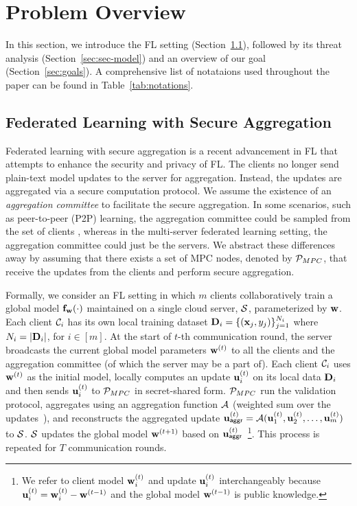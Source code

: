 
\section{Problem Overview}
\label{sec:prelim}

In this section, we introduce the FL setting (Section~\ref{sec:setup}), followed by its threat analysis (Section~\ref{sec:sec-model}) and an overview of our goal (Section~\ref{sec:goals}).
A comprehensive list of notataions used throughout the paper can be found in Table~\ref{tab:notations}.

\subsection{Federated Learning with Secure Aggregation}
\label{sec:setup}


Federated learning with secure aggregation is a recent advancement in FL that attempts to enhance the security and privacy of FL. The clients no longer send plain-text model updates to the server for aggregation. Instead, the updates are aggregated via a secure computation protocol. We assume the existence of an \emph{aggregation committee} to facilitate the secure aggregation. In some scenarios, such as peer-to-peer (P2P) learning, the aggregation committee could be sampled from the set of clients \cite{SP:MWAPR23,CCS:BBGLR20}, whereas in the multi-server federated learning setting, the aggregation committee could just be the servers. We abstract these differences away by assuming that there exists a set of MPC nodes, denoted by $\mathcal{P}_{MPC}$, that receive the updates from the clients and perform secure aggregation.



Formally, we consider an FL setting in which $m$ clients collaboratively train a global model $\mathbf{f}_{\mathbf{w}}(\cdot)$ maintained on a single cloud server, $\mathcal{S}$, parameterized by $\mathbf{w}$. Each client $\mathcal{C}_i$ has its own local training dataset $\mathbf{D}_i = \{(\mathbf{x}_j, y_j)\}_{j=1}^{N_i}$ where $N_i = |\mathbf{D}_i|$, for $i\in [m]$. 
At the start of $t$-th communication round, the server broadcasts the current global model parameters $\mathbf{w}^{(t)}$ to all the clients and the aggregation committee (of which the server may be a part of). Each client $\mathcal{C}_i$ uses $\mathbf{w}^{(t)}$ as the initial model, locally computes an update $\mathbf{u}^{(t)}_{i}$ on its local data $\mathbf{D}_i$ and then sends $\mathbf{u}^{(t)}_i$ to $\mathcal{P}_{MPC}$ in secret-shared form. 
$\mathcal{P}_{MPC}$ run the validation protocol, aggregates using an aggregation function $\mathcal{A}$ (\eg weighted sum over the updates~\cite{fedavg}), and reconstructs the aggregated update $\mathbf{u}_{\mathsf{aggr}}^{(t)} = \mathcal{A}(\mathbf{u}^{(t)}_1, \mathbf{u}^{(t)}_2, \dots, \mathbf{u}^{(t)}_{m})$ to $\mathcal{S}$. 
$\mathcal{S}$ updates the global model $\mathbf{w}^{(t+1)}$ based on $\mathbf{u}_{\mathsf{aggr}}^{(t)}$~\footnote{We refer to client model $\mathbf{w}^{(t)}_i$ and update $\mathbf{u}^{(t)}_i$ interchangeably because $\mathbf{u}^{(t)}_i = \mathbf{w}^{(t)}_i-\mathbf{w}^{(t-1)}$ and the global model $\mathbf{w}^{(t-1)}$ is public knowledge.}.
This process is repeated for $T$ communication rounds.

